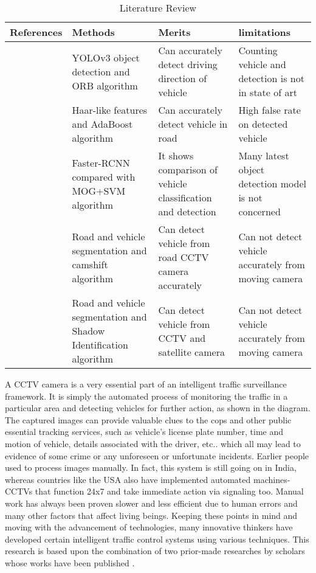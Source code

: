 \begin{table}[!h]
  \centering
  \caption[Literature Review]{Literature Review}
  \label{tab:lit_review}
  {\renewcommand{\arraystretch}{1.1}
\begin{tabular}{p{2cm} p{3cm} p{3cm} p{3cm}} 
   \toprule
  References & Methods & Merits & limitations \\
  \hline
  [Huansheng Song et al.]\cite{SongH2019} & YOLOv3 object detection and ORB algorithm
 & Can accurately detect driving direction of vehicle
 & Counting vehicle and detection is not in state of art
 \\ 
  \hline
  [Tang. Y. Zhang et al.]\cite{TangYong} & Haar-like features and AdaBoost algorithm
 & Can accurately detect
vehicle in road
 & High false rate on detected vehicle  \\ 
  \hline
  [Ahmad Arinaldi et al.]\cite{ARINALDI2018259} & Faster-RCNN compared with MOG+SVM algorithm
 & It shows comparison of vehicle classification and detection
 & Many latest object detection model is not concerned
 \\ 
  \hline
  [Lili Jia et al.]\cite{lilijia} & Road and vehicle segmentation and camshift algorithm
 & Can detect vehicle from road CCTV camera accurately
 & Can not detect vehicle accurately from moving camera
 \\ 
  \hline
  [Raad Ahmed Hadi et al.]\cite{10.1007/978-3-642-31968-6_70} & Road and vehicle segmentation and Shadow Identification algorithm
 & Can detect vehicle from CCTV and satellite camera
 & Can not detect vehicle accurately from moving camera
  \\
  \bottomrule
\end{tabular}
  }
\end{table}


A CCTV camera is a very essential part of an intelligent traffic surveillance framework. It is simply the automated process of monitoring the traffic in a particular area and detecting vehicles for further action, as shown in the diagram. The captured images can provide valuable clues to the cops and other public essential tracking services, such as vehicle’s license plate number, time and motion of vehicle, details associated with the driver, etc.. which all may lead to evidence of some crime or any unforeseen or unfortunate incidents. Earlier people used to process images manually. In fact, this system is still going on in India, whereas countries like the USA also have implemented automated machines- CCTVs that function 24x7 and take immediate action via signaling too. Manual work has always been proven slower and less efficient due to human errors and many other factors that affect living beings. Keeping these points in mind and moving with the advancement of technologies, many innovative thinkers have developed certain intelligent traffic control systems using various techniques. This research is based upon the combination of two prior-made researches by scholars whose works have been published \cite{Baran2016}.
